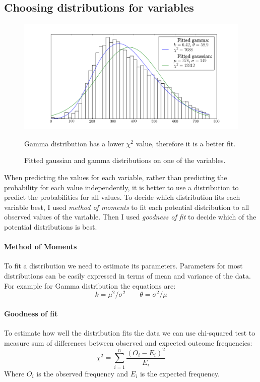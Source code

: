 \documentclass[12pt,a4paper]{book}
\newcommand\note[1]{\vspace*{-0.5\baselineskip}\caption*{#1}}
\begin{document}
\subsection{Choosing distributions for variables}
\begin{figure}[ht]
\centering
\includegraphics[scale=0.5]{fitted-distributions}
\caption{Fitted gaussian and gamma distributions on one of the variables.}
\note{Gamma distribution has a lower $\chi^2$ value, therefore it is a better fit.}
\label{fig:fitted-distributions}
\end{figure}
When predicting the values for each variable, rather than predicting the probability for each value independently, it is better to use a distribution to predict the probabilities for all values.
To decide which distribution fits each variable best, I used \emph{method of moments} to fit each potential distribution to all observed values of the variable.
Then I used \emph{goodness of fit} to decide which of the potential distributions is best.
\paragraph{Method of Moments}
To fit a distribution we need to estimate its parameters.
Parameters for most distributions can be easily expressed in terms of mean and variance of the data.
For example for Gamma distribution the equations are:
\begin{equation}
k= \mu^2/\sigma^2
\qquad
\theta = \sigma^2/\mu
\end{equation}
\paragraph{Goodness of fit}
To estimate how well the distribution fits the data we can use chi-squared test to measure sum of differences between observed and expected outcome frequencies:
\begin{equation}
\chi^2 = \sum_{i=1}^{n} \frac{(O_i - E_i)^2}{E_i}
\end{equation}
Where $O_i$ is the observed frequency and $E_i$ is the expected frequency.
\end{document}
